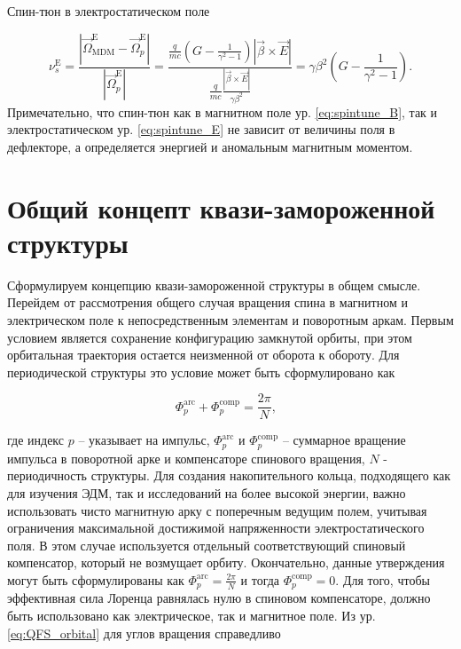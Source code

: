 \noindent Спин-тюн в электростатическом поле

\begin{equation} 
\nu_s^{\textrm{E}}=\frac{\left|{\vec{\Omega}}_{\textrm{MDM}}^{\textrm{E}}-{\vec{\Omega}}_p^{\textrm{E}}\right|}{\left|{\vec{\Omega}}_p^{\textrm{E}}\right|}=\frac{\frac{q}{mc}\left(G-\frac{1}{\gamma^2-1}\right)\left|\vec{\beta}\times\vec{E}\right|}{\frac{q}{mc}\frac{\left|\vec{\beta}\times\vec{E}\right|}{\gamma\beta^2}}=\gamma\beta^2\left(G-\frac{1}{\gamma^2-1}\right).
\label{eq:spintune_E}
\end{equation}
Примечательно, что спин-тюн как в магнитном поле ур. \ref{eq:spintune_B}, так и  электростатическом ур. \ref{eq:spintune_E} не зависит от величины поля в дефлекторе, а определяется энергией и аномальным магнитным моментом.

\section{Общий концепт квази-замороженной структуры}\label{sec:EDM/requirements/deflector}

\par Сформулируем концепцию квази-замороженной структуры в общем смысле. Перейдем от рассмотрения общего случая вращения спина в магнитном и электрическом поле к непосредственным элементам и поворотным аркам. Первым условием является сохранение конфигурацию замкнутой орбиты, при этом орбитальная траектория остается неизменной от оборота к обороту. Для периодической структуры это условие может быть сформулировано как 

\begin{equation}
	\Phi_p^{\textrm{arc}}+\Phi_{p}^{\textrm{comp}}=\frac{2\pi}{N},\ \ \
	\label{eq:QFS_orbital}
\end{equation}

\noindent где индекс $p$ -- указывает на импульс, $\Phi_p^{\textrm{arc}}$ и $\Phi_{p}^{\textrm{comp}}$ -- суммарное вращение импульса в поворотной арке и компенсаторе спинового вращения, $N$ - периодичность структуры. Для создания накопительного кольца, подходящего как для изучения ЭДМ, так и исследований на более высокой энергии, важно использовать чисто магнитную арку с поперечным ведущим полем, учитывая ограничения максимальной достижимой напряженности электростатического поля. В этом случае используется отдельный соответствующий спиновый компенсатор, который не возмущает орбиту. Окончательно, данные утверждения могут быть сформулированы как $\Phi_p^{\textrm{arc}} = \frac{2\pi}{N}$ и тогда $\Phi_{p}^{\textrm{comp}} = 0$. Для того, чтобы эффективная сила Лоренца равнялась нулю в спиновом компенсаторе, должно быть использовано как электрическое, так и магнитное поле. Из ур. \ref{eq:QFS_orbital} для углов вращения справедливо

